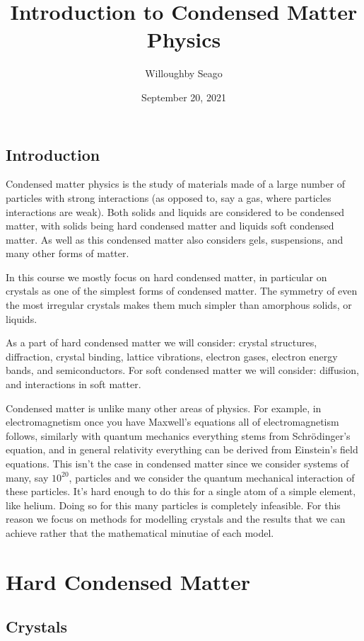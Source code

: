 \documentclass[fleqn]{NotesClass}
\title{Introduction to Condensed Matter Physics}
\author{Willoughby Seago}
\date{September 20, 2021}
\begin{document}
    \frontmatter
    \titlepage
    \tableofcontents
    \listoffigures
    \listoftables
    \mainmatter
    
    \chapter{Introduction}
    Condensed matter physics is the study of materials made of a large number of particles with strong interactions (as opposed to, say a gas, where particles interactions are weak).
    Both solids and liquids are considered to be condensed matter, with solids being hard condensed matter and liquids soft condensed matter.
    As well as this condensed matter also considers gels, suspensions, and many other forms of matter.
    
    In this course we mostly focus on hard condensed matter, in particular on crystals as one of the simplest forms of condensed matter.
    The symmetry of even the most irregular crystals makes them much simpler than amorphous solids, or liquids.
    
    As a part of hard condensed matter we will consider: crystal structures, diffraction, crystal binding, lattice vibrations, electron gases, electron energy bands, and semiconductors.
    For soft condensed matter we will consider: diffusion, and interactions in soft matter.
    
    Condensed matter is unlike many other areas of physics.
    For example, in electromagnetism once you have Maxwell's equations all of electromagnetism follows, similarly with quantum mechanics everything stems from Schr\"odinger's equation, and in general relativity everything can be derived from Einstein's field equations.
    This isn't the case in condensed matter since we consider systems of many, say \(10^{20}\), particles and we consider the quantum mechanical interaction of these particles.
    It's hard enough to do this for a single atom of a simple element, like helium.
    Doing so for this many particles is completely infeasible.
    For this reason we focus on methods for modelling crystals and the results that we can achieve rather that the mathematical minutiae of each model.
    
    \part{Hard Condensed Matter}
    \chapter{Crystals}
\end{document}
